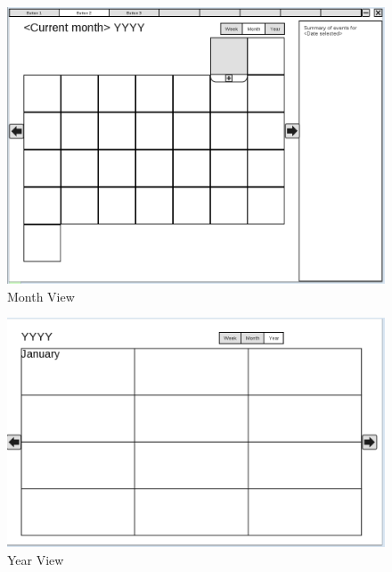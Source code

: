 \documentclass{article}
\begin{document}
\begin{figure}[hb]
\centering
\includegraphics[scale=0.5,angle=90]{CMCLGDRMonth.png}
\caption{Month View}
\label{fig:monthview}
\end{figure}

\begin{figure}[hb]
\centering
\includegraphics[scale=0.5,angle=90]{CMCLGDRYear.png}
\caption{Year View}
\label{fig:yearview}
\end{figure}
\end{document}
